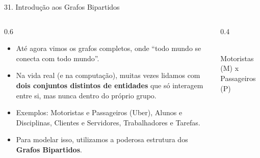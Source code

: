 \documentclass[9pt]{beamer}
\begin{document}
    \begin{frame}{31. Introdução aos Grafos Bipartidos}
        \begin{columns}
            \begin{column}{0.6\textwidth}
                \begin{itemize}
                    \item Até agora vimos os grafos completos, onde ``todo mundo se conecta com todo mundo''.
                    \item Na vida real (e na computação), muitas vezes lidamos com \textbf{dois conjuntos distintos de entidades} que só interagem entre si, mas nunca dentro do próprio grupo.
                    \item Exemplos: Motoristas e Passageiros (Uber), Alunos e Disciplinas, Clientes e Servidores, Trabalhadores e Tarefas.
                    \item Para modelar isso, utilizamos a poderosa estrutura dos \textbf{Grafos Bipartidos}.
                \end{itemize}
            \end{column}
            \begin{column}{0.4\textwidth}
                \centering
                \\
                \vspace{0.2cm}
                \tiny Motoristas (M) x Passageiros (P)
            \end{column}
        \end{columns}
    \end{frame}
\end{document}
